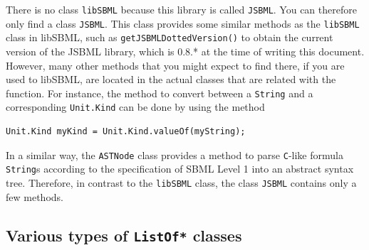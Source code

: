 \documentclass[
  BCOR12mm,
  letterpaper,
  11pt,
  headsepline,
  pointlessnumbers,
  tablecaptionabove,
  onelinecaption,
  headinclude,
  appendixprefix,
  idxtotoc,
  bibtotoc,
  twoside,
  titlepage
]{scrartcl}
\begin{document}
There is no class \texttt{libSBML} because this library is called
\texttt{JSBML}.
You can therefore only find a class \texttt{JSBML}.
This class provides some similar methods as the \texttt{libSBML} class in
libSBML, such as \texttt{getJSBMLDottedVersion()}
 to obtain the current
version of the JSBML library, which is 0.8.* at the time of writing this
document. However, many other methods that you might expect
to find there, if you are used to libSBML, are located in the actual classes
that are related with the function. For instance, the method to convert between
a \texttt{String}
and a corresponding \texttt{Unit.Kind}
can be done by using the method
\begin{lstlisting}
Unit.Kind myKind = Unit.Kind.valueOf(myString);
\end{lstlisting}
In a similar way, the \texttt{ASTNode} class provides a method to parse
\texttt{C}-like
formula \texttt{String}s according to the specification of SBML Level 1
\citep{Hucka2003} into an abstract syntax tree. Therefore, in contrast to the
\texttt{libSBML} class, the class \texttt{JSBML}
contains only a few methods.


\subsection{Various types of \texttt{ListOf*} classes}

\end{document}
